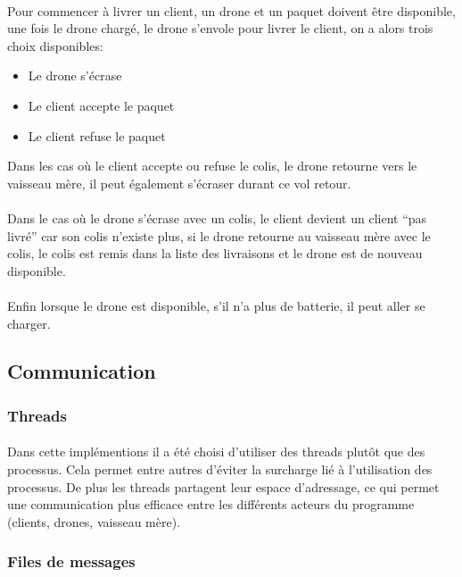 \documentclass[article, backcover, french, nodocumentinfo]{upmethodology-document}
\begin{document}
			\paragraph*{}
				Pour commencer à livrer un client, un drone et un paquet doivent être disponible, une fois le drone chargé, le drone s'envole pour livrer le client, on a alors trois choix disponibles:
				\begin{itemize}
					\item Le drone s'écrase
					\item Le client accepte le paquet
					\item Le client refuse le paquet
				\end{itemize}
				Dans les cas où le client accepte ou refuse le colis, le drone retourne vers le vaisseau mère, il peut également s'écraser durant ce vol retour.
			\paragraph*{}
				Dans le cas où le drone s'écrase avec un colis, le client devient un client ``pas livré'' car son colis n'existe plus, si le drone retourne au vaisseau mère avec le colis, le colis est remis dans la liste des livraisons et le drone est de nouveau disponible.
			\paragraph*{}
				Enfin lorsque le drone est disponible, s'il n'a plus de batterie, il peut aller se charger.
		\subsection{Communication}
			\subsubsection{Threads}
				\paragraph*{}
					Dans cette implémentions il a été choisi d'utiliser des threads plutôt que des processus. Cela permet entre autres d'éviter la surcharge lié à l'utilisation des processus. De plus les threads partagent leur espace d'adressage, ce qui permet une communication plus efficace entre les différents acteurs du programme (clients, drones, vaisseau mère).
			\subsubsection{Files de messages}
\end{document}
